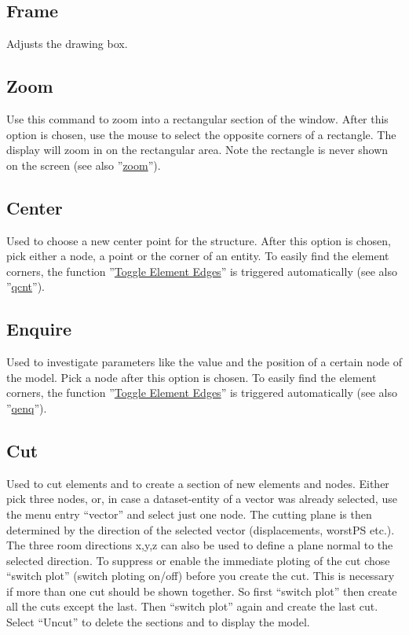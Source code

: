 \documentclass{article}
\providecommand{\htmlref}[2]{\hyperref[#2]{#1}}
\begin{document}
\subsection{\label{Frame}Frame}
Adjusts the drawing box.

\subsection{\label{Zoom}Zoom}
Use this command to zoom into a rectangular section of the window. After this option is chosen, use the mouse to select the opposite corners of a rectangle.  The display will zoom in on the rectangular area.  Note the rectangle is never shown on the screen (see also ''\htmlref{zoom}{zoom}'').

\subsection{\label{Center}Center}
Used to choose a new center point for the structure. After this option is chosen, pick either a node, a point or the corner of an entity. To easily find the element corners, the function ''\htmlref{Toggle Element Edges}{Toggle Element Edges}'' is triggered automatically (see also ''\htmlref{qcnt}{qcnt}'').

\subsection{\label{Enquire}Enquire}
Used to investigate parameters like the value and the position of a certain node of the model. Pick a node after this option is chosen. To easily find the element corners, the function ''\htmlref{Toggle Element Edges}{Toggle Element Edges}'' is triggered automatically (see also ''\htmlref{qenq}{qenq}'').

\subsection{\label{Cut}Cut}
Used to cut elements and to create a section of new elements and nodes. Either pick three nodes, or, in case a dataset-entity of a vector was already selected, use the menu entry ``vector'' and select just one node. The cutting plane is then determined by the direction of the selected vector (displacements, worstPS etc.). The three room directions x,y,z can also be used to define a plane normal to the selected direction. To suppress or enable the immediate ploting of the cut chose ``switch plot'' (switch ploting on/off) before you create the cut. This is necessary if more than one cut should be shown together. So first ``switch plot'' then create all the cuts except the last. Then ``switch plot'' again and create the last cut. Select ``Uncut'' to delete the sections and to display the model. 
\end{document}
